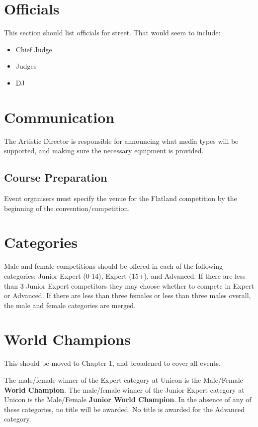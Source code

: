 \section{Officials}

\begin{framed}
This section should list officials for street.  That would seem to include:
\begin{itemize}
\item Chief Judge
\item Judges
\item DJ
\end{itemize}
\end{framed}

\section{Communication}

The Artistic Director is responsible for announcing what media types will be supported, and making sure the necessary equipment is provided.

\subsection{Course Preparation}

Event organisers must specify the venue for the Flatland competition by the beginning of the convention/competition.

\section{Categories}
Male and female competitions should be offered in each of the following categories: Junior Expert (0-14), Expert (15+), and Advanced.
If there are less than 3 Junior Expert competitors they may choose whether to compete in Expert or Advanced.
If there are less than three females or less than three males overall, the male and female categories are merged.

\section{World Champions}

\begin{framed}
This should be moved to Chapter 1, and broadened to cover all events.
\end{framed}

The male/female winner of the Expert category at Unicon is the Male/Female \textbf{World Champion}.
The male/female winner of the Junior Expert category at Unicon is the Male/Female \textbf{Junior World Champion}.
In the absence of any of these categories, no title will be awarded.
No title is awarded for the Advanced category.

